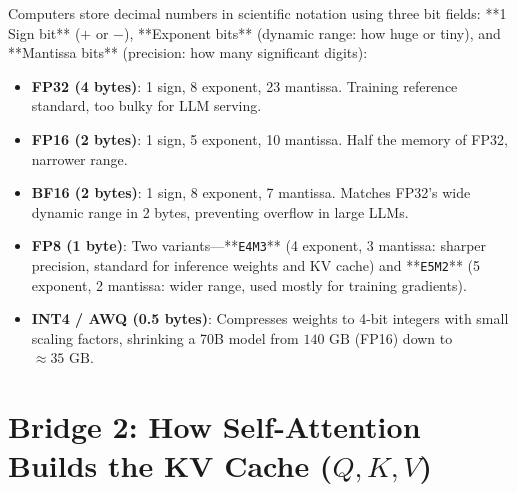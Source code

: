 Computers store decimal numbers in scientific notation using three bit fields: **1 Sign bit** ($+$ or $-$), **Exponent bits** (dynamic range: how huge or tiny), and **Mantissa bits** (precision: how many significant digits):
\begin{itemize}[leftmargin=18pt]
  \item \textbf{FP32 (4 bytes)}: 1 sign, 8 exponent, 23 mantissa. Training reference standard, too bulky for LLM serving.
  \item \textbf{FP16 (2 bytes)}: 1 sign, 5 exponent, 10 mantissa. Half the memory of FP32, narrower range.
  \item \textbf{BF16 (2 bytes)}: 1 sign, 8 exponent, 7 mantissa. Matches FP32's wide dynamic range in 2 bytes, preventing overflow in large LLMs.
  \item \textbf{FP8 (1 byte)}: Two variants---**\texttt{E4M3}** (4 exponent, 3 mantissa: sharper precision, standard for inference weights and KV cache) and **\texttt{E5M2}** (5 exponent, 2 mantissa: wider range, used mostly for training gradients).
  \item \textbf{INT4 / AWQ (0.5 bytes)}: Compresses weights to 4-bit integers with small scaling factors, shrinking a 70B model from $140\text{ GB}$ (FP16) down to $\approx 35\text{ GB}$.
\end{itemize}

\section{Bridge 2: How Self-Attention Builds the KV Cache ($Q, K, V$)}

